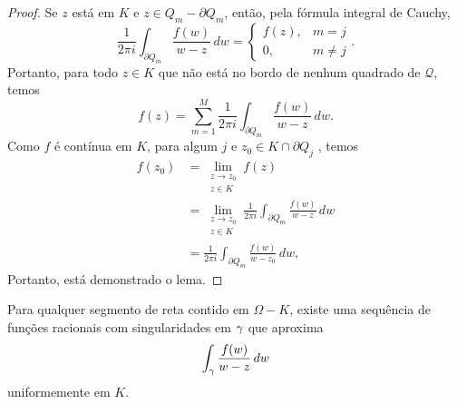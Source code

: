 \begin{proof}
        Se $z$ está em $K$ e $z \in Q_m - \partial Q_m$, então, pela fórmula integral de Cauchy,
        \begin{equation*}
            \frac{1}{2 \pi i}\int_{\partial Q_m} \frac{f(w)}{w-z}\, dw 
            = 
            \begin{cases}
                f(z), & m = j \\
                0,    & m \neq j
            \end{cases}
            .
        \end{equation*}
        Portanto, para todo $z\in K$ que não está no bordo de nenhum quadrado de $\mathcal{Q}$, 
        temos
        \begin{equation*}
            f(z) = \sum^{M}_{m=1}\frac{1}{2 \pi i}\int_{\partial Q_m}\frac{f(w)}{w-z}\,dw.
        \end{equation*}
        Como $f$ é contínua em $K$, para algum $j$ e $z_0 \in K \cap \partial Q_j$ , temos
        \begin{align*}
            f(z_0) &= \lim_{\substack{z \to z_0 \\ z\in K}} f(z) \\
                   &= \lim_{\substack{z \to z_0 \\ z\in K}} 
                      \frac{1}{2 \pi i}
                      \int_{\partial Q_m}\frac{f(w)}{w-z}\,dw \\
                   &= \frac{1}{2 \pi i}
                      \int_{\partial Q_m}\frac{f(w)}{w-z_0}\,dw,
        \end{align*}
        Portanto, está demonstrado o lema.
    \end{proof}
    \begin{lema}
    \label{LR2}
        Para qualquer segmento de reta contido em $\Omega - K$, existe uma sequência 
        de funções racionais com singularidades em $\gamma$ que aproxima
        \begin{equation*}
        \int_\gamma \frac{f(w)}{w-z}\,dw
        \end{equation*}
        uniformemente em $K$.
    \end{lema}
